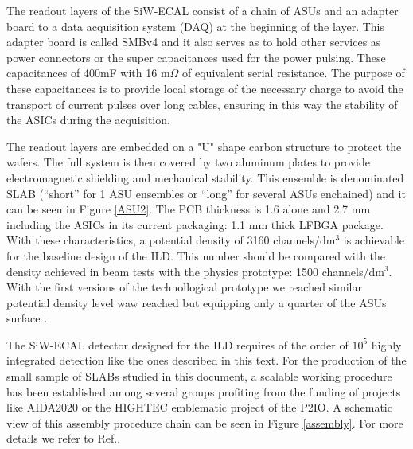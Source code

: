 \documentclass[a4paper,11pt]{article}
\begin{document}
The readout layers of the SiW-ECAL consist of a chain of ASUs and an adapter board
to a data acquisition system (DAQ) at the beginning of the layer.
This adapter board is called SMBv4
and it also serves as to hold other services as power connectors or the super capacitances used for the power pulsing. 
These capacitances of 400mF with 16 m$\Omega$ of equivalent serial resistance. 
The purpose of these capacitances is to provide local storage 
of the necessary charge to avoid the transport of current pulses over long cables, 
ensuring in this way the stability of the ASICs during the acquisition.

The readout layers are embedded on a "U" shape carbon structure to protect the wafers.
The full system is then covered by two aluminum plates
to provide electromagnetic shielding and mechanical stability.
This ensemble is denominated SLAB
(``short'' for 1 ASU ensembles or ``long'' for several ASUs enchained) and it can be seen in
Figure \ref{ASU2}.
The PCB thickness is 1.6 alone and 2.7 mm
including the ASICs in its current packaging: 1.1 mm thick LFBGA package.
With these characteristics, a potential density of
3160 channels/dm$^{3}$ is achievable for the baseline design 
of the ILD. This number should be compared with
the density achieved in beam tests with the physics prototype: 1500 channels/dm$^{3}$.
With the first versions
of the technollogical prototype we reached similar potential density level waw reached but equipping only a
quarter of the ASUs surface \cite{Amjad:2014tha}.

The SiW-ECAL detector designed for the ILD requires of the order
of $10^{5}$ highly integrated detection like the ones described in this text.
For the production of the small sample of SLABs studied in this document,
a scalable working procedure has been established among several groups \cite{Boudry:2318814}
profiting from the funding of projects like AIDA2020 or the HIGHTEC emblematic project
of the P2IO. A schematic view of this assembly procedure chain can be seen in
Figure \ref{assembly}. For more details we refer to Ref.\cite{Boudry:2318814}.
\end{document}
